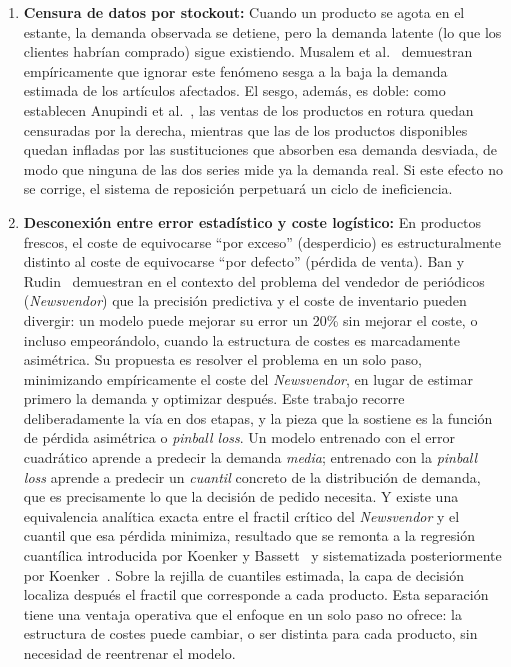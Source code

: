 \begin{enumerate}
    \item \textbf{Censura de datos por stockout:} Cuando un producto se agota en el estante, la demanda observada se detiene, pero la demanda latente (lo que los clientes habrían comprado) sigue existiendo. Musalem et al.~\cite{musalem2010structural} demuestran empíricamente que ignorar este fenómeno sesga a la baja la demanda estimada de los artículos afectados. El sesgo, además, es doble: como establecen Anupindi et al.~\cite{anupindi1998stockout}, las ventas de los productos en rotura quedan censuradas por la derecha, mientras que las de los productos disponibles quedan infladas por las sustituciones que absorben esa demanda desviada, de modo que ninguna de las dos series mide ya la demanda real. Si este efecto no se corrige, el sistema de reposición perpetuará un ciclo de ineficiencia.
    \item \textbf{Desconexión entre error estadístico y coste logístico:} En productos frescos, el coste de equivocarse ``por exceso'' (desperdicio) es estructuralmente distinto al coste de equivocarse ``por defecto'' (pérdida de venta). Ban y Rudin~\cite{ban2019big} demuestran en el contexto del problema del vendedor de periódicos (\textit{Newsvendor}) que la precisión predictiva y el coste de inventario pueden divergir: un modelo puede mejorar su error un 20\% sin mejorar el coste, o incluso empeorándolo, cuando la estructura de costes es marcadamente asimétrica. Su propuesta es resolver el problema en un solo paso, minimizando empíricamente el coste del \textit{Newsvendor}, en lugar de estimar primero la demanda y optimizar después. Este trabajo recorre deliberadamente la vía en dos etapas, y la pieza que la sostiene es la función de pérdida asimétrica o \textit{pinball loss}. Un modelo entrenado con el error cuadrático aprende a predecir la demanda \emph{media}; entrenado con la \textit{pinball loss} aprende a predecir un \emph{cuantil} concreto de la distribución de demanda, que es precisamente lo que la decisión de pedido necesita. Y existe una equivalencia analítica exacta entre el fractil crítico del \textit{Newsvendor} y el cuantil que esa pérdida minimiza, resultado que se remonta a la regresión cuantílica introducida por Koenker y Bassett~\cite{koenkerbassett1978} y sistematizada posteriormente por Koenker~\cite{koenker2005quantile}. Sobre la rejilla de cuantiles estimada, la capa de decisión localiza después el fractil que corresponde a cada producto. Esta separación tiene una ventaja operativa que el enfoque en un solo paso no ofrece: la estructura de costes puede cambiar, o ser distinta para cada producto, sin necesidad de reentrenar el modelo.
\end{enumerate}

